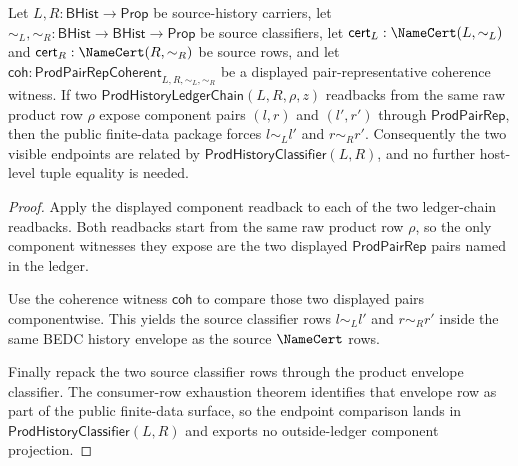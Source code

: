 \begin{theorem}
\label{thm:prod-component-ledger-endpoint-determinacy}
Let $L,R:\mathsf{BHist}\to\mathsf{Prop}$ be source-history carriers, let
$\sim_L,\sim_R:\mathsf{BHist}\to\mathsf{BHist}\to\mathsf{Prop}$ be source
classifiers, let $\mathsf{cert}_L:\NameCert(L,\sim_L)$ and
$\mathsf{cert}_R:\NameCert(R,\sim_R)$ be source rows, and let
$\mathsf{coh}:\mathsf{ProdPairRepCoherent}_{L,R,\sim_L,\sim_R}$ be a displayed
pair-representative coherence witness. If two
$\mathsf{ProdHistoryLedgerChain}(L,R,\rho,z)$ readbacks from the same raw
product row $\rho$ expose component pairs $(l,r)$ and $(l',r')$ through
$\mathsf{ProdPairRep}$, then the public finite-data package forces
$l\sim_L l'$ and $r\sim_R r'$. Consequently the two visible endpoints are
related by $\mathsf{ProdHistoryClassifier}(L,R)$, and no further host-level
tuple equality is needed.
\end{theorem}
\begin{proof}
Apply the displayed component readback to each of the two ledger-chain
readbacks. Both readbacks start from the same raw product row $\rho$, so the
only component witnesses they expose are the two displayed
$\mathsf{ProdPairRep}$ pairs named in the ledger.

Use the coherence witness $\mathsf{coh}$ to compare those two displayed pairs
componentwise. This yields the source classifier rows $l\sim_L l'$ and
$r\sim_R r'$ inside the same BEDC history envelope as the source
$\NameCert$ rows.

Finally repack the two source classifier rows through the product envelope
classifier. The consumer-row exhaustion theorem identifies that envelope row
as part of the public finite-data surface, so the endpoint comparison lands in
$\mathsf{ProdHistoryClassifier}(L,R)$ and exports no outside-ledger component
projection.
\end{proof}

